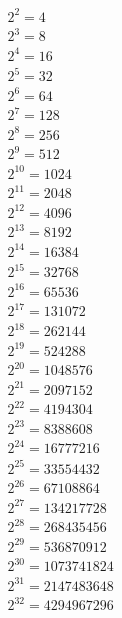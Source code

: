 \begin{align*}
& 2^{2}=4 \\
& 2^{3}=8 \\
& 2^{4}=16 \\
& 2^{5}=32 \\
& 2^{6}=64 \\
& 2^{7}=128 \\
& 2^{8}=256 \\
& 2^{9}=512 \\
& 2^{10}=1024 \\
& 2^{11}=2048 \\
& 2^{12}=4096 \\
& 2^{13}=8192 \\
& 2^{14}=16384 \\
& 2^{15}=32768 \\
& 2^{16}=65536 \\
& 2^{17}=131072 \\
& 2^{18}=262144 \\
& 2^{19}=524288 \\
& 2^{20}=1048576 \\
& 2^{21}=2097152 \\
& 2^{22}=4194304 \\
& 2^{23}=8388608 \\
& 2^{24}=16777216 \\
& 2^{25}=33554432 \\
& 2^{26}=67108864 \\
& 2^{27}=134217728 \\
& 2^{28}=268435456 \\
& 2^{29}=536870912 \\
& 2^{30}=1073741824 \\
& 2^{31}=2147483648 \\
& 2^{32}=4294967296 \\
\end{align*}

